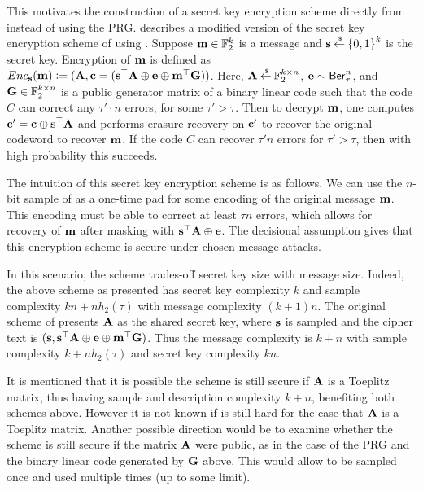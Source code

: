 This motivates the construction of a secret key encryption scheme directly from \LPN instead of using the \LPN PRG.
\cite{Piet12} describes a modified version of the secret key encryption scheme of \cite{ICALP:GilRobSeu08} using \LPN.
Suppose ${\mathbf m} \in {\mathbb F}_2^k$ is a message and ${\mathbf s} \mathbin{\stackrel{\mbox{\,\tiny \$}}{\gets}} {\{0,1\}}^k$ is the secret key.
Encryption of ${\mathbf m}$ is defined as $Enc_{\mathbf s}({\mathbf m}) {\;\vcentcolon=\;} ({\mathbf A}, {\mathbf c} = ({\mathbf s}^\top{\mathbf A} \oplus {\mathbf e} \oplus {\mathbf m}^\top{\mathbf G}))$.
Here, ${\mathbf A} \mathbin{\stackrel{\mbox{\,\tiny \$}}{\gets}} {\mathbb F}_2^{k\times n}$, ${\mathbf e} \sim \mathsf{Ber}_\tau^n$, and ${\mathbf G} \in {\mathbb F}_2^{k\times n}$ is a public generator matrix of a binary linear code such that the code $C$ can correct any $\tau'\cdot n$ errors, for some $\tau' > \tau$.
Then to decrypt ${\mathbf m}$, one computes ${\mathbf c}' = {\mathbf c} \oplus {\mathbf s}^\top {\mathbf A}$ and performs erasure recovery on ${\mathbf c}'$ to recover the original codeword to recover ${\mathbf m}$.
If the code $C$ can recover $\tau' n$ errors for $\tau' > \tau$, then with high probability this succeeds.

The intuition of this secret key encryption scheme is as follows.
We can use the $n$-bit sample of \LPN as a one-time pad for some encoding of the original message ${\mathbf m}$.
This encoding must be able to correct at least $\tau n $ errors, which allows for recovery of ${\mathbf m}$ after masking with ${\mathbf s}^\top {\mathbf A} \oplus {\mathbf e}$.
The decisional \LPN assumption gives that this encryption scheme is secure under chosen message attacks.

In this scenario, the scheme trades-off secret key size with message size.
Indeed, the above scheme as presented has secret key complexity $k$ and sample complexity $kn + nh_2(\tau)$ with message complexity $(k+1)n$.
The original scheme of \cite{ICALP:GilRobSeu08} presents ${\mathbf A}$ as the shared secret key, where ${\mathbf s}$ is sampled and the cipher text is $({\mathbf s}, {\mathbf s}^\top {\mathbf A} \oplus {\mathbf e} \oplus {\mathbf m}^\top{\mathbf G})$.
Thus the message complexity is $k + n$ with sample complexity $k + nh_2(\tau)$ and secret key complexity $kn$.

It is mentioned that it is possible the scheme is still secure if ${\mathbf A}$ is a Toeplitz matrix, thus having sample and description complexity $k+n$, benefiting both schemes above.
However it is not known if \LPN is still hard for the case that ${\mathbf A}$ is a Toeplitz matrix.
Another possible direction would be to examine whether the scheme is still secure if the matrix ${\mathbf A}$ were public, as in the case of the \LPN PRG and the binary linear code generated by ${\mathbf G}$ above.
This would allow \bA to be sampled once and used multiple times (up to some limit).

